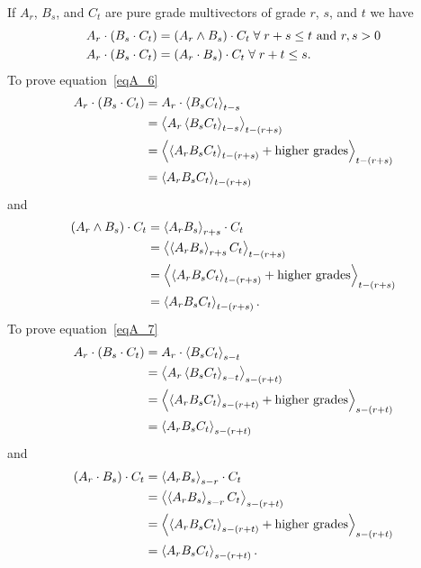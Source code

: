If $A_{r}$, $B_{s}$, and $C_{t}$ are pure grade multivectors of grade $r$, $s$, and $t$ we have
\begin{align}
	A_{r}\cdot\left ( {B_{s}\cdot C_{t}} \right ) &= \left ( {A_{r}\wedge B_{s}} \right )\cdot C_{t} \;\forall\; r+s\le t \mbox{ and } r,s > 0 \label{eqA_6}\\
	A_{r}\cdot\left ( {B_{s}\cdot C_{t}} \right ) &= \left ( {A_{r}\cdot B_{s}} \right )\cdot C_{t} \;\forall\; r+t\le s \label{eqA_7}.
\end{align} 
To prove equation~\ref{eqA_6}
\begin{align}
	A_{r}\cdot\left ( {B_{s}\cdot C_{t}} \right ) &= A_{r}\cdot\left < {B_{s}C_{t}} \right >_{t-s} \nonumber \\
	                                   &= \left < {A_{r}\left < {B_{s}C_{t}} \right >_{t-s}} \right >_{t-\left ( {r+s} \right )} \nonumber \\
	                                   &= \left < {\left < {A_{r}B_{s}C_{t}} \right >_{t-\left ( {r+s} \right )}+\mbox{higher grades}} \right >_{t-\left ( {r+s} \right )} \nonumber \\
	                                   &= \left < {A_{r}B_{s}C_{t}} \right >_{t-\left ( {r+s} \right )}
\end{align}
and
\begin{align}
	\left ( {A_{r}\wedge B_{s}} \right )\cdot C_{t}   &= \left < {A_{r}B_{s}} \right >_{r+s}\cdot C_{t} \nonumber \\
	                                   &= \left < {\left < {A_{r}B_{s}} \right >_{r+s}C_{t}} \right >_{t-\left ( {r+s} \right )} \nonumber \\
	                                   &= \left < {\left < {A_{r}B_{s}C_{t}} \right >_{t-\left ( {r+s} \right )}+\mbox{higher grades}} \right >_{t-\left ( {r+s} \right )} \nonumber \\
	                                   &= \left < {A_{r}B_{s}C_{t}} \right >_{t-\left ( {r+s} \right )}.
\end{align}
To prove equation~\ref{eqA_7}
\begin{align}
	A_{r}\cdot\left ( {B_{s}\cdot C_{t}} \right ) &= A_{r}\cdot\left < {B_{s}C_{t}} \right >_{s-t} \nonumber \\
	                                   &= \left < {A_{r}\left < {B_{s}C_{t}} \right >_{s-t}} \right >_{s-\left ( {r+t} \right )} \nonumber \\
	                                   &= \left < {\left < {A_{r}B_{s}C_{t}} \right >_{s-\left ( {r+t} \right )}+\mbox{higher grades}} \right >_{s-\left ( {r+t} \right )} \nonumber \\
	                                   &= \left < {A_{r}B_{s}C_{t}} \right >_{s-\left ( {r+t} \right )}
\end{align}
and
\begin{align}
	\left ( {A_{r}\cdot B_{s}} \right )\cdot C_{t} &= \left < {A_{r}B_{s}} \right >_{s-r}\cdot C_{t} \nonumber \\
	                                    &= \left < {\left < {A_{r}B_{s}} \right >_{s-r}C_{t}} \right >_{s-\left ( {r+t} \right )} \nonumber \\
	                                    &= \left < {\left < {A_{r}B_{s}C_{t}} \right >_{s-\left ( {r+t} \right )}+\mbox{higher grades}} \right >_{s-\left ( {r+t} \right )} \nonumber \\
	                                    &= \left < {A_{r}B_{s}C_{t}} \right >_{s-\left ( {r+t} \right )}.
\end{align}
